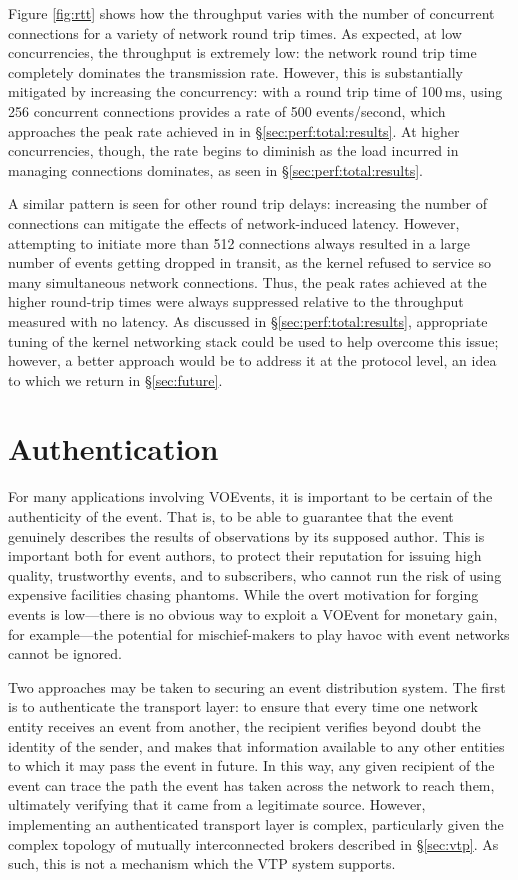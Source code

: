 \documentclass[5p,authoryear]{elsarticle}
\begin{document}
Figure \ref{fig:rtt} shows how the throughput varies with the number of
concurrent connections for a variety of network round trip times. As expected,
at low concurrencies, the throughput is extremely low: the network round trip
time completely dominates the transmission rate. However, this is
substantially mitigated by increasing the concurrency: with a round trip time
of 100\,ms, using 256 concurrent connections provides a rate of 500
events/second, which approaches the peak rate achieved in in
\S\ref{sec:perf:total:results}. At higher concurrencies, though, the rate
begins to diminish as the load incurred in managing connections dominates,
as seen in \S\ref{sec:perf:total:results}.

A similar pattern is seen for other round trip delays: increasing the number
of connections can mitigate the effects of network-induced latency. However,
attempting to initiate more than 512 connections always resulted in a large
number of events getting dropped in transit, as the kernel refused to service
so many simultaneous network connections. Thus, the peak rates achieved at the
higher round-trip times were always suppressed relative to the throughput
measured with no latency. As discussed in \S\ref{sec:perf:total:results},
appropriate tuning of the kernel networking stack could be used to help
overcome this issue; however, a better approach would be to address it at the
protocol level, an idea to which we return in \S\ref{sec:future}.

\section{Authentication}
\label{sec:security}

For many applications involving VOEvents, it is important to be certain of the
authenticity of the event. That is, to be able to guarantee that the event
genuinely describes the results of observations by its supposed author. This
is important both for event authors, to protect their reputation for issuing
high quality, trustworthy events, and to subscribers, who cannot run the risk
of using expensive facilities chasing phantoms. While the overt motivation for
forging events is low---there is no obvious way to exploit a VOEvent for
monetary gain, for example---the potential for mischief-makers to play havoc
with event networks cannot be ignored.

Two approaches may be taken to securing an event distribution system. The
first is to authenticate the transport layer: to ensure that every time one
network entity receives an event from another, the recipient verifies beyond
doubt the identity of the sender, and makes that information available to any
other entities to which it may pass the event in future. In this way, any
given recipient of the event can trace the path the event has taken across the
network to reach them, ultimately verifying that it came from a legitimate
source.  However, implementing an authenticated transport layer is complex,
particularly given the complex topology of mutually interconnected brokers
described in \S\ref{sec:vtp}. As such, this is not a mechanism which the VTP
system supports.
\end{document}
